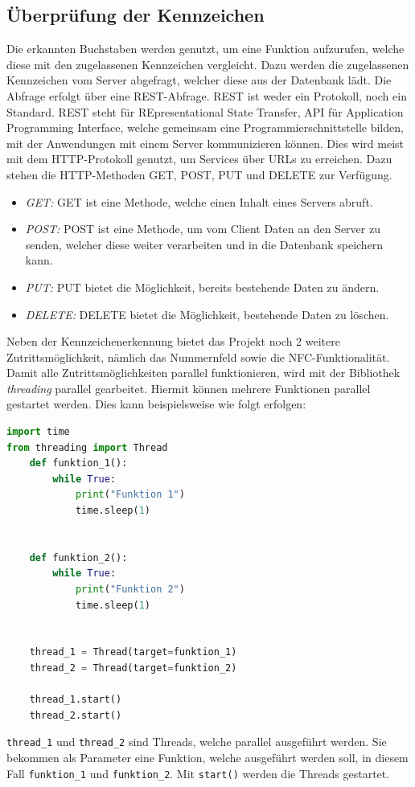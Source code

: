 \subsection{Überprüfung der Kennzeichen}
Die erkannten Buchstaben werden genutzt, um eine Funktion aufzurufen, welche diese mit den zugelassenen Kennzeichen vergleicht. Dazu werden die zugelassenen Kennzeichen vom Server abgefragt, welcher diese aus der Datenbank lädt. Die Abfrage erfolgt über eine REST-Abfrage.
REST ist weder ein Protokoll, noch ein Standard. REST steht für REpresentational State Transfer, API für Application Programming Interface, welche gemeinsam eine Programmierschnittstelle bilden, mit der Anwendungen mit einem Server kommunizieren können. Dies wird meist mit dem HTTP-Protokoll genutzt, um Services über URLs zu erreichen. Dazu stehen die HTTP-Methoden GET, POST, PUT und DELETE zur Verfügung.
\begin{itemize}
    \item \textit{GET: } GET ist eine Methode, welche einen Inhalt eines Servers abruft.
    \item \textit{POST: } POST ist eine Methode, um vom Client Daten an den Server zu senden, welcher diese weiter verarbeiten und in die Datenbank speichern kann.
    \item \textit{PUT: } PUT bietet die Möglichkeit, bereits bestehende Daten zu ändern.
    \item \textit{DELETE: } DELETE bietet die Möglichkeit, bestehende Daten zu löschen.
\end{itemize}\cite{WhatIsREST}
Neben der Kennzeichenerkennung bietet das Projekt noch 2 weitere Zutrittsmöglichkeit, nämlich das Nummernfeld sowie die NFC-Funktionalität. Damit alle Zutrittsmöglichkeiten parallel funktionieren, wird mit der Bibliothek \textit{threading} parallel gearbeitet. Hiermit können mehrere Funktionen parallel gestartet werden. Dies kann beispielsweise wie folgt erfolgen: 
\begin{lstlisting}[language=Python, caption=Funktionsweise von Multiprocessing, label=lst:lsg:multiprocessing]
import time
from threading import Thread
    def funktion_1():
        while True:
            print("Funktion 1")
            time.sleep(1)
    
    
    def funktion_2():
        while True:
            print("Funktion 2")
            time.sleep(1)
    
    
    thread_1 = Thread(target=funktion_1)
    thread_2 = Thread(target=funktion_2)
    
    thread_1.start()
    thread_2.start()
\end{lstlisting}
\verb|thread_1| und \verb|thread_2| sind Threads, welche parallel ausgeführt werden. Sie bekommen als Parameter eine Funktion, welche ausgeführt werden soll, in diesem Fall \verb|funktion_1| und \verb|funktion_2|. Mit \verb|start()| werden die Threads gestartet.
    \cite{threading}
